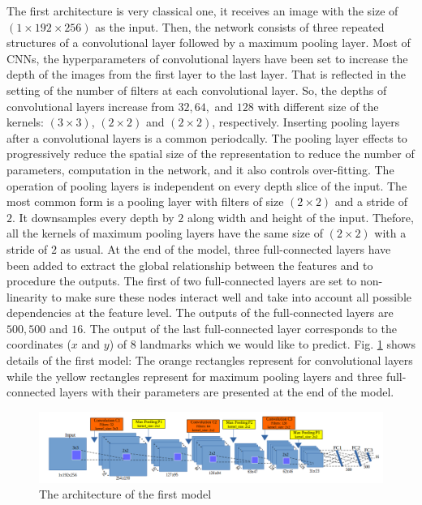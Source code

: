 \documentclass[review]{elsarticle}
\begin{document}
The first architecture is very classical one, it receives an image with the size of $(1 \times 192 \times 256)$ as the input. Then, the network consists of three repeated structures of a convolutional layer followed by a maximum pooling layer. Most of CNNs, the hyperparameters of convolutional layers have been set to increase the depth of the images from the first layer to the last layer. That is reflected in the setting of the number of filters at each convolutional layer. So, the depths of convolutional layers increase from $32, 64, $ and $128$ with different size of the kernels: $(3 \times 3)$, $(2 \times 2)$ and $(2 \times 2)$, respectively. Inserting pooling layers after a convolutional layers is a common periodcally. The pooling layer effects to progressively reduce the spatial size of the representation to reduce the number of parameters, computation in the network, and it also controls over-fitting. The operation of pooling layers is independent on every depth slice of the input. The most common form is a pooling layer with filters of size $(2 \times 2)$ and a stride of $2$. It downsamples every depth by $2$ along width and height of the input. Thefore, all the kernels of maximum pooling layers have the same size of $(2 \times 2)$ with a stride of $2$ as usual. At the end of the model, three full-connected layers have been added to extract the global relationship between the features and to procedure the outputs. The first of two full-connected layers are set to non-linearity to make sure these nodes interact well and take into account all possible dependencies at the feature level. The outputs of the full-connected layers are $500, 500$ and $16$. The output of the last full-connected layer corresponds to the coordinates ($x$ and $y$) of $8$ landmarks which we would like to predict. Fig. \ref{fignet1} shows details of the first model: The orange rectangles represent for convolutional layers while the yellow rectangles represent for maximum pooling layers and three full-connected layers with their parameters are presented at the end of the model.

\begin{figure}[!h]
	\centering
	\includegraphics[scale=0.3]{images/net1}
	\caption{The architecture of the first model}
	\label{fignet1}
\end{figure}
\end{document}
